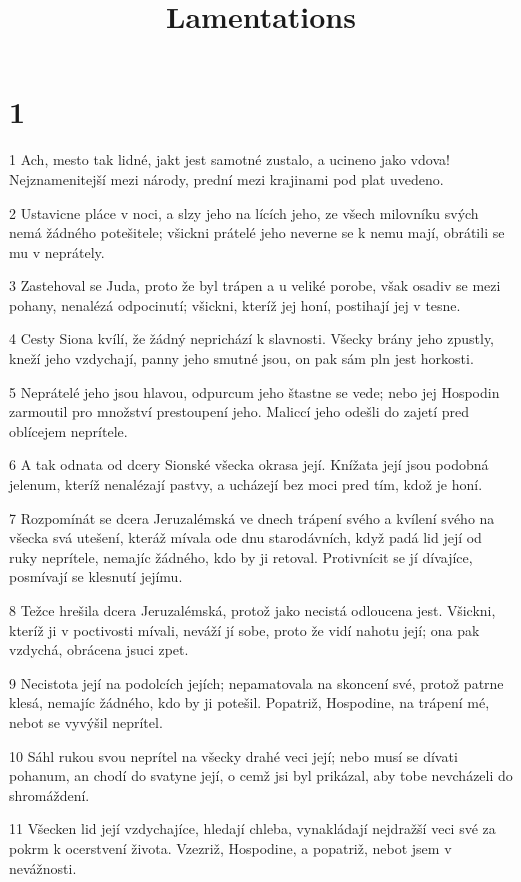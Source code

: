 

\title{Lamentations}

\chapter{1}

\par 1 Ach, mesto tak lidné, jakt jest samotné zustalo, a ucineno jako vdova! Nejznamenitejší mezi národy, prední mezi krajinami pod plat uvedeno.
\par 2 Ustavicne pláce v noci, a slzy jeho na lících jeho, ze všech milovníku svých nemá žádného potešitele; všickni prátelé jeho neverne se k nemu mají, obrátili se mu v neprátely.
\par 3 Zastehoval se Juda, proto že byl trápen a u veliké porobe, však osadiv se mezi pohany, nenalézá odpocinutí; všickni, kteríž jej honí, postihají jej v tesne.
\par 4 Cesty Siona kvílí, že žádný neprichází k slavnosti. Všecky brány jeho zpustly, kneží jeho vzdychají, panny jeho smutné jsou, on pak sám pln jest horkosti.
\par 5 Neprátelé jeho jsou hlavou, odpurcum jeho štastne se vede; nebo jej Hospodin zarmoutil pro množství prestoupení jeho. Maliccí jeho odešli do zajetí pred oblícejem neprítele.
\par 6 A tak odnata od dcery Sionské všecka okrasa její. Knížata její jsou podobná jelenum, kteríž nenalézají pastvy, a ucházejí bez moci pred tím, kdož je honí.
\par 7 Rozpomínát se dcera Jeruzalémská ve dnech trápení svého a kvílení svého na všecka svá utešení, kteráž mívala ode dnu starodávních, když padá lid její od ruky neprítele, nemajíc žádného, kdo by ji retoval. Protivnícit se jí dívajíce, posmívají se klesnutí jejímu.
\par 8 Težce hrešila dcera Jeruzalémská, protož jako necistá odloucena jest. Všickni, kteríž ji v poctivosti mívali, neváží jí sobe, proto že vidí nahotu její; ona pak vzdychá, obrácena jsuci zpet.
\par 9 Necistota její na podolcích jejích; nepamatovala na skoncení své, protož patrne klesá, nemajíc žádného, kdo by ji potešil. Popatriž, Hospodine, na trápení mé, nebot se vyvýšil neprítel.
\par 10 Sáhl rukou svou neprítel na všecky drahé veci její; nebo musí se dívati pohanum, an chodí do svatyne její, o cemž jsi byl prikázal, aby tobe nevcházeli do shromáždení.
\par 11 Všecken lid její vzdychajíce, hledají chleba, vynakládají nejdražší veci své za pokrm k ocerstvení života. Vzezriž, Hospodine, a popatriž, nebot jsem v nevážnosti.
